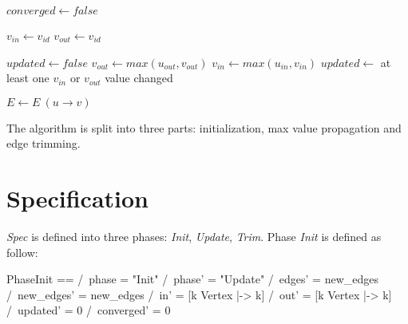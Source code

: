 \begin{algorithmic}[1]

\State $converged \gets false$

    
        \State $v_{in} \gets v_{id}$
        \State $v_{out} \gets v_{id}$
    \EndFor

    \State $updated \gets false$
            \State $v_{out} \gets max(u_{out},v_{out})$
            \State $v_{in} \gets max(u_{in},v_{in})$
        \EndFor
        \State $updated \gets$ at least one $v_{in}$ or $v_{out}$ value changed 
    \EndWhile

            \State $E \gets E \ (u \rightarrow v)$
        \EndIf
    \EndFor

\EndWhile
\end{algorithmic}

The algorithm is split into three parts: initialization, max value
propagation and edge trimming.

\section{Specification}

\textit{Spec} is defined into three phases: \textit{Init}, \textit{Update},
\textit{Trim}. Phase \textit{Init} is defined as follow:\\
\begin{tla}
PhaseInit == 
    /\ phase = "Init" 
    /\ phase' = "Update"
    /\ edges' = new_edges
    /\ new_edges' = new_edges
    /\ in' = [k \in Vertex |-> k]
    /\ out' = [k \in Vertex |-> k]
    /\ updated' = 0
    /\ converged' = 0
\end{tla}
\begin{tlatex}
%
%
%
%
%
%
%
%
%
\end{tlatex}\\

